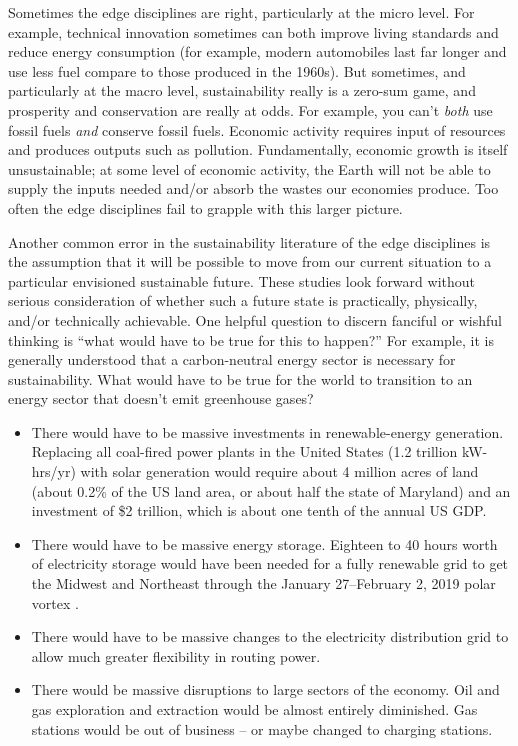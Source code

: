 \documentclass[12pt]{article}
\begin{document}
Sometimes the edge disciplines are right, particularly at the micro level.
For example, technical innovation sometimes can both 
improve living standards and reduce energy consumption
(for example, modern automobiles last far longer and use less fuel compare to those produced in the 1960s).
But sometimes, and particularly at the macro level,
sustainability really is a zero-sum game, and 
prosperity and conservation are really at odds.
For example, you can't \emph{both} use fossil fuels \emph{and} conserve fossil fuels.
Economic activity requires input of resources
and produces outputs such as pollution. 
Fundamentally, economic growth is itself unsustainable; 
at some level of economic activity,
the Earth will not be able to supply the inputs needed and/or 
absorb the wastes our economies produce.
Too often the edge disciplines fail to grapple with this larger picture.

Another common error in the sustainability literature of the edge disciplines
is the assumption that it will be possible to move 
from our current situation to a particular envisioned sustainable future. 
These studies look forward without
serious consideration of whether such a future state 
is practically, physically, and/or technically achievable. 
One helpful question to discern fanciful or wishful thinking
is ``what would have to be true for this to happen?''
For example, it is generally understood that a carbon-neutral 
energy sector is necessary for sustainability.
What would have to be true for the world to transition to an energy sector 
that doesn't emit greenhouse gases?
%
\begin{itemize}

  \item There would have to be massive investments in renewable-energy generation. 
        Replacing all coal-fired power plants in the United States (1.2 trillion kW-hrs/yr) %
        with solar generation would require about 4 million acres of land 
        (about 0.2\% of the US land area, or about half the state of Maryland) 
        and an investment of \$2 trillion, which is about one tenth of the annual US GDP. 

  \item There would have to be massive energy storage. 
        Eighteen to 40 hours worth of electricity storage would 
        have been needed for a fully renewable grid to get the Midwest and Northeast 
		through the January 27--February 2, 2019 polar vortex \cite{wood2019}.
		
  \item There would have to be massive changes to the electricity distribution grid
  	to allow much greater flexibility in routing power.
  
  \item There would be massive disruptions to large sectors of the economy. 
        Oil and gas exploration and extraction would be almost entirely diminished.
		Gas stations would be out of business -- or maybe changed to charging stations.

\end{itemize}
\end{document}
